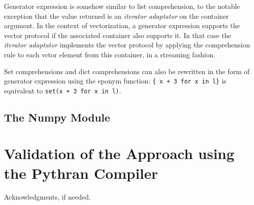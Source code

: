 \documentclass[preprint]{sigplanconf}
\begin{document}
Generator expression is somehow similar to list comprehension, to the notable
exception that the value returned is an \emph{iterator adaptator} on the
container argument. In the context of vectorization, a generator expression
supports the vector protocol if the associated container also supports it. In
that case the  \emph{iterator adaptator} implements the vector protocol by
applying the comprehension rule to each vctor element from this container, in a
streaming fashion.

Set comprehensions and dict comprehensions can also be rewritten in the form of
generator expression using the eponym function: \texttt{\{ x + 3 for x in l\}}
is equivalent to \texttt{set(x + 3 for x in l)}.

\subsection{The Numpy Module}

\section{Validation of the Approach using the Pythran Compiler}
\label{sec:benchs}

\acks

Acknowledgments, if needed.

\cite{*}



\end{document}
